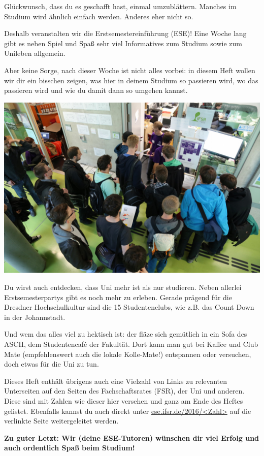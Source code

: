 
Glückwunsch, dass du es geschafft hast, einmal umzublättern.
Manches im Studium wird ähnlich einfach werden. Anderes eher nicht so.

Deshalb veranstalten wir die Erstsemestereinführung (ESE)!
Eine Woche lang gibt es neben Spiel und Spaß sehr viel Informatives zum Studium sowie zum Unileben allgemein.

Aber keine Sorge, nach dieser Woche ist nicht alles vorbei: in diesem Heft wollen wir dir ein bisschen zeigen, was hier in deinem Studium so passieren wird, wo das passieren wird und wie du damit dann so umgehen kannst.

\begin{minipage}{.65\textwidth}
  \includegraphics[width=\textwidth]{img/ese2015/bueroansturm.jpg}
\end{minipage}%
\hspace*{.6cm}%
\begin{minipage}{.3\textwidth}
  \vspace*{1.5em}
  Du wirst auch entdecken, dass Uni mehr ist als nur studieren. 
  Neben allerlei Erstsemesterpartys gibt es noch mehr zu erleben. 
  Gerade prägend für die Dresdner Hochschulkultur sind die 15 Studentenclubs, wie z.B. das Count Down in der Johannstadt.\\[1em]
\end{minipage}

Und wem das alles viel zu hektisch ist: der fläze sich gemütlich in ein Sofa des ASCII, dem Studentencafé der Fakultät. 
Dort kann man gut bei Kaffee und Club Mate (empfehlenswert auch die lokale Kolle-Mate!) entspannen oder versuchen, doch etwas für die Uni zu tun.

Dieses Heft enthält übrigens auch eine Vielzahl von Links zu relevanten Unterseiten auf den Seiten des Fachschaftsrates (FSR), der Uni und anderen. 
Diese sind mit Zahlen wie dieser hier  versehen und ganz am Ende des Heftes gelistet. Ebenfalls kannst du auch direkt unter \url{ese.ifsr.de/2016/<Zahl>} auf die verlinkte Seite weitergeleitet werden.

\textbf{Zu guter Letzt: Wir (deine ESE-Tutoren) wünschen dir viel Erfolg und auch ordentlich Spaß beim Studium!}
